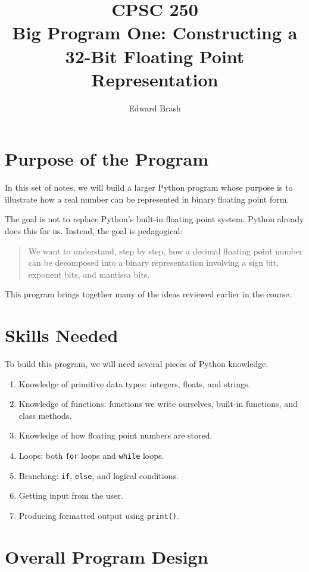 \documentclass[11pt]{article}
\title{CPSC 250 \\ Big Program One: Constructing a 32-Bit Floating Point Representation}
\author{Edward Brash}
\date{}
\begin{document}
\maketitle

\section{Purpose of the Program}

In this set of notes, we will build a larger Python program whose purpose is to illustrate how a real number can be represented in binary floating point form.

The goal is not to replace Python's built-in floating point system. Python already does this for us. Instead, the goal is pedagogical:

\begin{quote}
We want to understand, step by step, how a decimal floating point number can be decomposed into a binary representation involving a sign bit, exponent bits, and mantissa bits.
\end{quote}

This program brings together many of the ideas reviewed earlier in the course.

\section{Skills Needed}

To build this program, we will need several pieces of Python knowledge.

\begin{enumerate}
    \item Knowledge of primitive data types: integers, floats, and strings.
    \item Knowledge of functions: functions we write ourselves, built-in functions, and class methods.
    \item Knowledge of how floating point numbers are stored.
    \item Loops: both \texttt{for} loops and \texttt{while} loops.
    \item Branching: \texttt{if}, \texttt{else}, and logical conditions.
    \item Getting input from the user.
    \item Producing formatted output using \texttt{print()}.
\end{enumerate}

\section{Overall Program Design}
\end{document}
